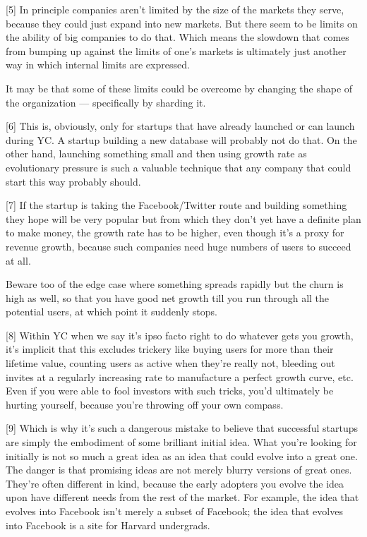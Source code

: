[5]
In principle companies aren't limited by the size of the markets
they serve, because they could just expand into new markets.  But
there seem to be limits on the ability of big companies to do that.
Which means the slowdown that comes from bumping up against the
limits of one's markets is ultimately just another way in which
internal limits are expressed.

It may be that some of these limits could be overcome by changing
the shape of the organization --- specifically by sharding it.

[6]
This is, obviously, only for startups that have already launched
or can launch during YC.  A startup building a new database will
probably not do that.  On the other hand, launching something small
and then using growth rate as evolutionary pressure is such a
valuable technique that any company that could start this way
probably should.

[7]
If the startup is taking the Facebook/Twitter route and building
something they hope will be very popular but from which they don't
yet have a definite plan to make money, the growth rate has to be
higher, even though it's a proxy for revenue growth, because such
companies need huge numbers of users to succeed at all.

Beware too of the edge case where something spreads rapidly but the
churn is high as well, so that you have good net growth till you run
through all the potential users, at which point it suddenly stops.

[8]
Within YC when we say it's ipso facto right to do whatever gets
you growth, it's implicit that this excludes trickery like buying
users for more than their lifetime value, counting users as active
when they're really not, bleeding out invites at a regularly
increasing rate to manufacture a perfect growth curve, etc.  Even
if you were able to fool investors with such tricks, you'd ultimately
be hurting yourself, because you're throwing off your own compass.

[9]
Which is why it's such a dangerous mistake to believe that
successful startups are simply the embodiment of some brilliant
initial idea.  What you're looking for initially is not so much a
great idea as an idea that could evolve into a great one.   The
danger is that promising ideas are not merely blurry versions of
great ones.  They're often different in kind, because the early
adopters you evolve the idea upon have different needs from the
rest of the market.  For example, the idea that evolves into Facebook
isn't merely a subset of Facebook; the idea that evolves into
Facebook is a site for Harvard undergrads.

